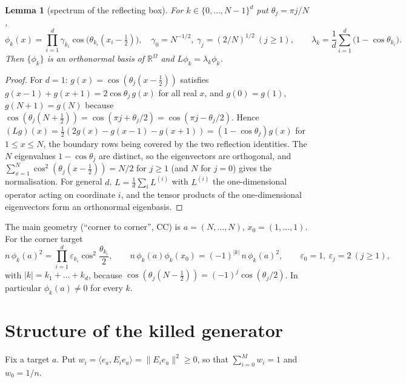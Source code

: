 \documentclass[11pt,a4paper]{article}
\newcommand{\R}{\mathbb R}
\newcommand{\ip}[2]{\langle #1,#2\rangle}
\theoremstyle{plain}
\newtheorem{lemma}[theorem]{Lemma}
\theoremstyle{definition}
\numberwithin{equation}{section}
\begin{document}
\begin{lemma}[spectrum of the reflecting box]\label{lem:boxspec}
For $k\in\{0,\dots,N-1\}^d$ put $\theta_j=\pi j/N$,
\begin{equation}\label{eq:boxeig}
\phi_k(x)=\prod_{i=1}^d \gamma_{k_i}\cos\!\big(\theta_{k_i}(x_i-\tfrac12)\big),\quad \gamma_0=N^{-1/2},\ \gamma_j=(2/N)^{1/2}\ (j\ge1),\qquad
\lambda_k=\frac1d\sum_{i=1}^d\big(1-\cos\theta_{k_i}\big).
\end{equation}
Then $\{\phi_k\}$ is an orthonormal basis of $\R^\Omega$ and $L\phi_k=\lambda_k\phi_k$.
\end{lemma}
\begin{proof}
For $d=1$: $g(x)=\cos(\theta_j(x-\frac12))$ satisfies $g(x-1)+g(x+1)=2\cos\theta_j\,g(x)$ for all real $x$, and $g(0)=g(1)$, $g(N+1)=g(N)$ because $\cos(\theta_j(N+\frac12))=\cos(\pi j+\theta_j/2)=\cos(\pi j-\theta_j/2)$. Hence $(Lg)(x)=\frac12(2g(x)-g(x-1)-g(x+1))=(1-\cos\theta_j)g(x)$ for $1\le x\le N$, the boundary rows being covered by the two reflection identities. The $N$ eigenvalues $1-\cos\theta_j$ are distinct, so the eigenvectors are orthogonal, and $\sum_{x=1}^N\cos^2(\theta_j(x-\frac12))=N/2$ for $j\ge1$ (and $N$ for $j=0$) gives the normalisation. For general $d$, $L=\frac1d\sum_i L^{(i)}$ with $L^{(i)}$ the one-dimensional operator acting on coordinate $i$, and the tensor products of the one-dimensional eigenvectors form an orthonormal eigenbasis.
\end{proof}

The main geometry (``corner to corner'', CC) is $a=(N,\dots,N)$, $x_0=(1,\dots,1)$. For the corner target
\begin{equation}\label{eq:cornerweights}
n\,\phi_k(a)^2=\prod_{i=1}^d\varepsilon_{k_i}\cos^2\frac{\theta_{k_i}}2,\qquad
n\,\phi_k(a)\phi_k(x_0)=(-1)^{|k|}\,n\,\phi_k(a)^2,\qquad \varepsilon_0=1,\ \varepsilon_j=2\ (j\ge1),
\end{equation}
with $|k|=k_1+\dots+k_d$, because $\cos(\theta_j(N-\frac12))=(-1)^j\cos(\theta_j/2)$. In particular $\phi_k(a)\neq0$ for every $k$.

\section{Structure of the killed generator}\label{sec:structure}

Fix a target $a$. Put $w_i=\ip{e_a}{E_ie_a}=\|E_ie_a\|^2\ge0$, so that $\sum_{i=0}^M w_i=1$ and $w_0=1/n$.
\end{document}
